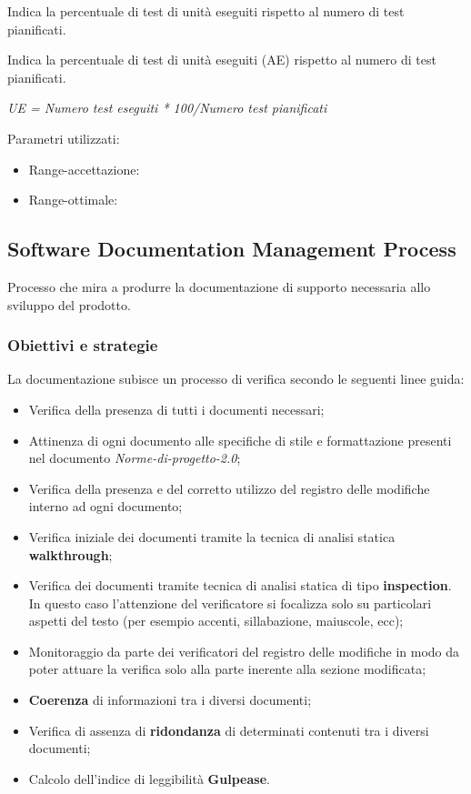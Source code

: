 \documentclass[a4paper,11pt]{article}
\begin{document}
\begin{itemize}
Indica la percentuale di test di unità eseguiti rispetto al numero di test pianificati.

Indica la percentuale di test di unità eseguiti (AE) rispetto al numero di test pianificati.
\begin{center}
\textit{UE = Numero test eseguiti * 100/Numero test pianificati}
\end{center}
Parametri utilizzati: 
\begin{itemize}
	\item Range-accettazione: \begin{math}[100\%]\end{math}
\item Range-ottimale: \begin{math}[100\%]\end{math}
	\end{itemize}

\subsection{Software Documentation Management Process}
Processo che mira a produrre la documentazione di supporto necessaria allo sviluppo del prodotto.
\subsubsection{Obiettivi e strategie}
La documentazione subisce un processo di verifica secondo le seguenti linee guida:  
\begin{itemize}
\item Verifica della presenza di tutti i documenti necessari;
\item Attinenza di ogni documento alle specifiche di stile e formattazione presenti nel documento \textit{Norme-di-progetto-2.0};
\item Verifica della presenza e del corretto utilizzo del registro delle modifiche interno ad ogni documento;
\item Verifica iniziale dei documenti tramite la tecnica di analisi statica \textbf{walkthrough};
\item Verifica dei documenti tramite tecnica di analisi statica di tipo \textbf{inspection}. In questo caso l'attenzione del verificatore si focalizza solo su particolari aspetti del testo (per esempio accenti, sillabazione, maiuscole, ecc);
\item Monitoraggio da parte dei verificatori del registro delle modifiche in modo da poter attuare la verifica solo alla parte inerente alla sezione modificata;
\item \textbf{Coerenza} di informazioni tra i diversi documenti;
\item Verifica di assenza di \textbf{ridondanza} di determinati contenuti tra i diversi documenti;
\item Calcolo dell'indice di leggibilità \textbf{Gulpease}.
\end{itemize}


\end{itemize}
\end{document}
